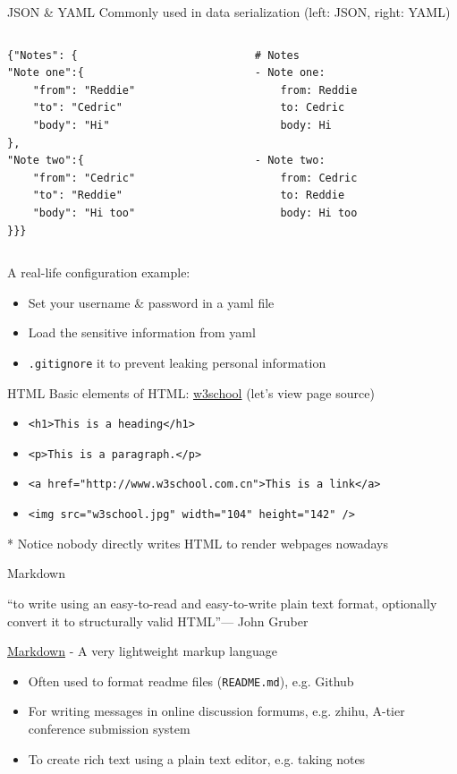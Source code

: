 \documentclass{../TexTemplate/myslide}
\begin{document}
\begin{frame}[fragile]{JSON \& YAML}
Commonly used in data serialization (left: JSON, right: YAML)
\begin{columns}
\begin{column}{0.5\linewidth}
\begin{lstlisting}[language=xml]
{"Notes": {
"Note one":{
	"from": "Reddie"
	"to": "Cedric"
	"body": "Hi"
},
"Note two":{
	"from": "Cedric"
	"to": "Reddie"
	"body": "Hi too"
}}}
\end{lstlisting}
\end{column}
\begin{column}{0.5\linewidth}
\begin{lstlisting}[language=xml]
# Notes
- Note one:
	from: Reddie
	to: Cedric
	body: Hi

- Note two:
	from: Cedric
	to: Reddie
	body: Hi too
\end{lstlisting}
\end{column}
\end{columns}
A real-life configuration example:
\begin{itemize}
\item Set your username \& password in a yaml file
\item Load the sensitive information from yaml
\item \verb'.gitignore' it to prevent leaking personal information
\end{itemize}
\end{frame}

\begin{frame}[fragile]{HTML}
Basic elements of HTML: \href{https://www.w3school.com.cn/html/html_basic.asp}{w3school} (let's view page source)
\begin{itemize}
	\item \verb'<h1>This is a heading</h1>'
	\item \verb'<p>This is a paragraph.</p>'
	\item \verb'<a href="http://www.w3school.com.cn">This is a link</a>'
	\item \verb'<img src="w3school.jpg" width="104" height="142" />'
\end{itemize}
* Notice nobody directly writes HTML to render webpages nowadays
\end{frame}

\begin{frame}[fragile]{Markdown}
\begin{flushleft}
``to write using an easy-to-read and easy-to-write plain text format, optionally convert it to structurally valid HTML''\hfill --- John Gruber
\end{flushleft}
\href{https://en.wikipedia.org/wiki/Markdown}{Markdown} - A very lightweight markup language
\begin{itemize}
	\item Often used to format readme files (\verb'README.md'), e.g. Github
	\item For writing messages in online discussion formums, e.g. zhihu, A-tier conference submission system
	\item To create rich text using a plain text editor, e.g. taking notes
\end{itemize}
\end{frame}
\end{document}
